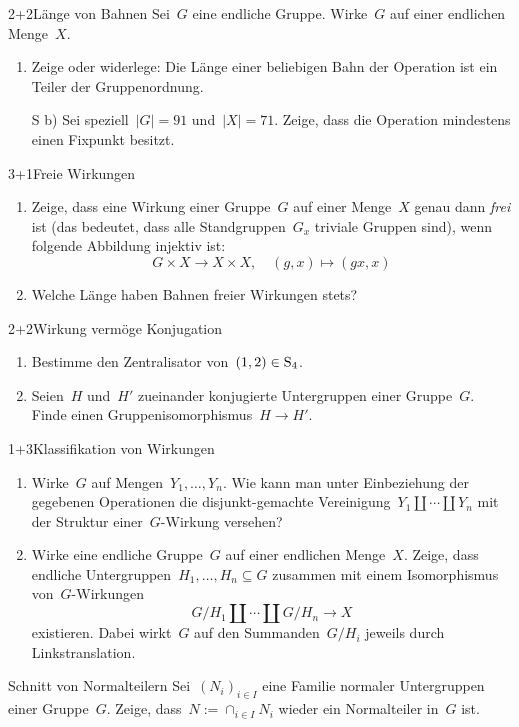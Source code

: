 \documentclass{algblatt}
\begin{document}

\begin{aufgabe}{2+2}{Länge von Bahnen}
Sei~$G$ eine endliche Gruppe. Wirke~$G$ auf einer endlichen Menge~$X$.
\begin{enumerate}
\item Zeige oder widerlege: Die Länge einer beliebigen Bahn der Operation ist
ein Teiler der Gruppenordnung.
\item[S b)]
Sei speziell~$|G| = 91$ und~$|X| = 71$. Zeige, dass die Operation mindestens
einen Fixpunkt besitzt.
\end{enumerate}
\end{aufgabe}

\begin{aufgabe}{3+1}{Freie Wirkungen}
\begin{enumerate}
\item Zeige, dass eine Wirkung einer Gruppe~$G$ auf einer Menge~$X$
genau dann \emph{frei} ist (das bedeutet, dass alle
Standgruppen~$G_x$ triviale Gruppen sind), wenn folgende Abbildung injektiv
ist:
\[ G \times X \longrightarrow X \times X, \quad
  (g,x) \mapsto (gx, x) \]
\item Welche Länge haben Bahnen freier Wirkungen stets?
\end{enumerate}
\end{aufgabe}

\begin{aufgabe}{2+2}{Wirkung vermöge Konjugation}
\begin{enumerate}
\item Bestimme den Zentralisator von~$(1,2) \in \mathrm{S}_4$.
\item Seien~$H$ und~$H'$ zueinander konjugierte Untergruppen einer Gruppe~$G$.
Finde einen Gruppenisomorphismus~$H \to H'$.
\end{enumerate}
\end{aufgabe}

\begin{aufgabe}{1+3}{Klassifikation von Wirkungen}
\begin{enumerate}
\item Wirke~$G$ auf Mengen~$Y_1,\ldots,Y_n$. Wie kann man unter Einbeziehung
der gegebenen Operationen die disjunkt-gemachte
Vereinigung~$Y_1 \amalg \cdots \amalg Y_n$ mit der Struktur einer~$G$-Wirkung versehen?
\item
Wirke eine endliche Gruppe~$G$ auf einer endlichen Menge~$X$. Zeige, dass
endliche Untergruppen~$H_1,\ldots,H_n \subseteq G$ zusammen mit einem Isomorphismus
von~$G$-Wirkungen
\[ G/H_1 \amalg \cdots \amalg G/H_n \longrightarrow X \]
existieren. Dabei wirkt~$G$ auf den Summanden~$G/H_i$ jeweils durch
Linkstranslation.
\end{enumerate}
\end{aufgabe}

\begin{aufgabe}{4}{Schnitt von Normalteilern}
Sei~$(N_i)_{i \in I}$ eine Familie normaler Untergruppen
einer Gruppe~$G$. Zeige, dass~$N := \cap_{i \in I} N_i$ wieder ein Normalteiler in~$G$
ist.
\end{aufgabe}
\end{document}
